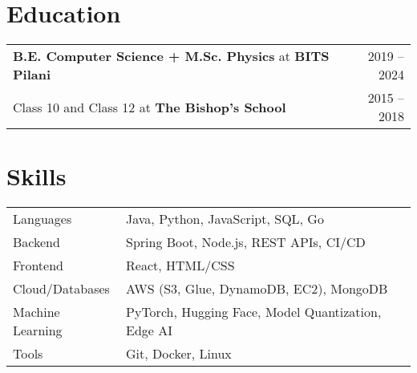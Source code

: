 \documentclass[a4paper,12pt]{article}
\begin{document}
\section{Education}
\begin{tabularx}{\linewidth}{@{}X r@{}}
\textbf{B.E. Computer Science + M.Sc. Physics} at \textbf{BITS Pilani} & 2019 -- 2024 \\

Class 10 and Class 12 at \textbf{The Bishop's School} & 2015 -- 2018 \\
\end{tabularx}
\vspace{-2mm}



\section{Skills}
\begin{tabularx}{\linewidth}{@{}l X@{}}
Languages & Java, Python, JavaScript, SQL, Go \\
Backend  & Spring Boot, Node.js, REST APIs, CI/CD \\
Frontend & React, HTML/CSS \\
Cloud/Databases & AWS (S3, Glue, DynamoDB, EC2), MongoDB \\
Machine Learning & PyTorch, Hugging Face, Model Quantization, Edge AI \\
Tools & Git, Docker, Linux \\
\end{tabularx}

\vfill
\end{document}
